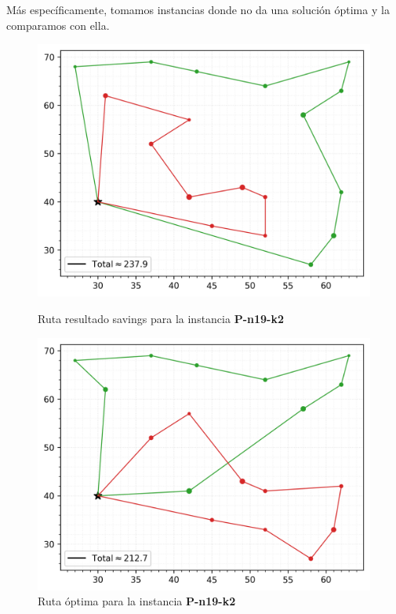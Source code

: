 Más específicamente, tomamos instancias donde no da una solución óptima y la comparamos con ella.
\begin{figure}[H]
	\centering
	\begin{minipage}{0.35\textwidth}
		\centering
		\includegraphics[width=1\textwidth]{images/savings/malosavingchico2}
		\caption{\footnotesize Ruta resultado savings para la instancia \textbf{P-n19-k2}}
		\label{fig:savings-malo-chico2}
	\end{minipage}%
	\hspace{0.03\textwidth}
	\begin{minipage}{0.35\textwidth}
		\centering
		\includegraphics[width=1\textwidth]{images/savings/optimochico2}
		\caption{\footnotesize Ruta óptima para la instancia \textbf{P-n19-k2}}
		\label{fig:savings-optimo-chico2}
	\end{minipage}%
\end{figure}
